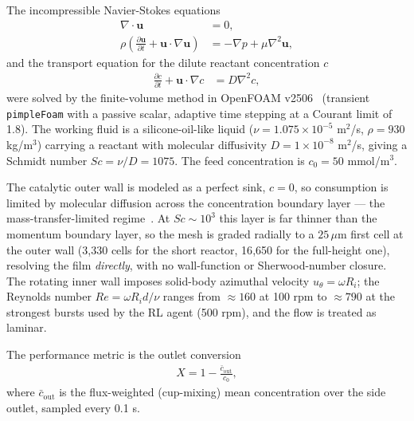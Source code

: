 \documentclass{article}
\begin{document}
The incompressible Navier-Stokes equations
\begin{align}
    \nabla \cdot \mathbf{u} &= 0, \\
    \rho \left( \frac{\partial \mathbf{u}}{\partial t} + \mathbf{u} \cdot \nabla \mathbf{u} \right) &= -\nabla p + \mu \nabla^2 \mathbf{u},
\end{align}
and the transport equation for the dilute reactant concentration $c$
\begin{align}
    \frac{\partial c}{\partial t} + \mathbf{u} \cdot \nabla c &= D \nabla^2 c,
\end{align}
were solved by the finite-volume method in OpenFOAM
v2506~\cite{weller1998openfoam} (transient \texttt{pimpleFoam} with a passive
scalar, adaptive time stepping at a Courant limit of 1.8). The working fluid is
a silicone-oil-like liquid ($\nu = 1.075\times10^{-5}$ m$^2$/s,
$\rho = 930$ kg/m$^3$) carrying a reactant with molecular diffusivity
$D = 1\times10^{-8}$ m$^2$/s, giving a Schmidt number $Sc = \nu/D = 1075$. The
feed concentration is $c_0 = 50$ mmol/m$^3$.

The catalytic outer wall is modeled as a perfect sink, $c = 0$, so consumption
is limited by molecular diffusion across the concentration boundary layer ---
the mass-transfer-limited regime~\cite{bergman2011fundamentals}. At
$Sc \sim 10^3$ this layer is far thinner than the momentum boundary layer, so
the mesh is graded radially to a $25\,\mu$m first cell at the outer wall
(3{,}330 cells for the short reactor, 16{,}650 for the full-height one),
resolving the film \emph{directly}, with no wall-function or Sherwood-number
closure. The rotating inner wall imposes solid-body azimuthal velocity
$u_\theta = \omega R_i$; the Reynolds number $Re = \omega R_i d / \nu$ ranges
from $\approx 160$ at 100 rpm to $\approx 790$ at the strongest bursts used by
the RL agent (500 rpm), and the flow is treated as laminar.

The performance metric is the outlet conversion
\begin{align}
    X = 1 - \frac{\bar{c}_\mathrm{out}}{c_0},
\end{align}
where $\bar{c}_\mathrm{out}$ is the flux-weighted (cup-mixing) mean
concentration over the side outlet, sampled every 0.1 s.
\end{document}
